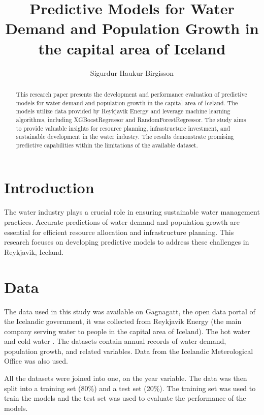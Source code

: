 \documentclass{article}
\begin{document}
\title{Predictive Models for Water Demand and Population Growth in the capital area of Iceland}
\author{Sigurdur Haukur Birgisson}

\maketitle

\begin{abstract}
    This research paper presents the development and performance evaluation of predictive models for water demand and population growth in the capital area of Iceland. The models utilize data provided by Reykjavik Energy and leverage machine learning algorithms, including XGBoostRegressor and RandomForestRegressor. The study aims to provide valuable insights for resource planning, infrastructure investment, and sustainable development in the water industry. The results demonstrate promising predictive capabilities within the limitations of the available dataset.
\end{abstract}

\tableofcontents
\newpage

\section{Introduction}
The water industry plays a crucial role in ensuring sustainable water management practices. Accurate predictions of water demand and population growth are essential for efficient resource allocation and infrastructure planning. This research focuses on developing predictive models to address these challenges in Reykjavik, Iceland.

\section{Data}
The data used in this study was available on Gagnagatt, the open data portal of the Icelandic government, it was collected from Reykjavik Energy (the main company serving water to people in the capital area of Iceland). The hot water \cite{hot-water} and cold water \cite{cold-water}. The datasets contain annual records of water demand, population growth, and related variables. Data from the Icelandic Meterological Office \cite{weather} was also used.

All the datasets were joined into one, on the year variable. The data was then split into a training set (80\%) and a test set (20\%). The training set was used to train the models and the test set was used to evaluate the performance of the models.
\end{document}
